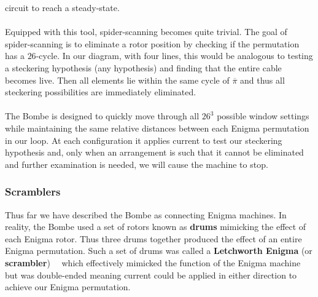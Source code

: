 circuit to reach
a steady-state.
\\\\Equipped with this tool, spider-scanning becomes quite trivial.
The goal of spider-scanning is to eliminate a rotor position by
checking if the permutation has a $26$-cycle. In our diagram, with four lines,
this would be analogous to testing a steckering hypothesis (any
hypothesis) and finding that the entire cable becomes live. Then all
elements lie within the same cycle of $\overline\pi$ and thus all
steckering possibilities are immediately eliminated.
\\\\The Bombe is designed to quickly move through all $26^3$ possible
window settings while maintaining the same relative distances between
each Enigma permutation in our loop. At each configuration
it applies current to test our steckering hypothesis and, only when
an arrangement is such that it
cannot be eliminated and further examination is needed, we will cause
the machine to stop.

\subsubsection{Scramblers}
Thus far we have described the Bombe as connecting Enigma machines.
In reality, the Bombe used a set of rotors known as {\bf{drums}}
mimicking the effect of each Enigma rotor. Thus three drums together
produced the effect of an entire Enigma permutation. Such a set of
drums was called a {\bf{Letchworth Enigma}} (or {\bf{scrambler}})~\cite[p.~102]{Turing1940ProfBook}~\cite[p.~39]{Welchman1982HutSix} which effectively
mimicked the function of the Enigma machine but was double-ended
meaning current could be applied in either direction to achieve our
Enigma permutation.

